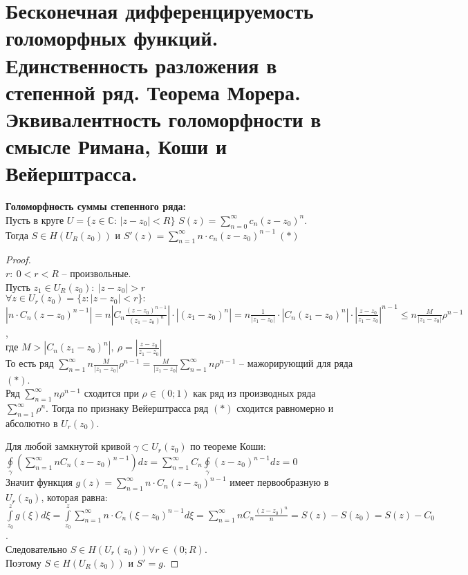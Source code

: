 \newpage
\section{Бесконечная дифференцируемость голоморфных функций. Единственность разложения в степенной ряд. Теорема Морера. Эквивалентность голоморфности в смысле Римана, Коши и Вейерштрасса.}


\textbf{Голоморфность суммы степенного ряда:}\\[2mm]
Пусть в круге $U=\{z\in \mathbb{C}: \, |z-z_0|<R\}$  $S(z) = \sum_{n=0}^\infty c_n (z-z_0)^n$.\\
Тогда $S \in H(U_R(z_0))$ и $S'(z)=\sum_{n=1}^\infty n\cdot c_n(z-z_0)^{n-1} \ (*)$

\begin{proof}
    \ \\
    $r: \ 0<r<R$ -- произвольные.\\
    Пусть $z_1 \in U_R(z_0): \ |z-z_0| > r$\\
    $\forall z \in U_r(z_0) = \{z: |z-z_0|<r\}:$\\
    $|n\cdot C_n(z-z_0)^{n-1}| = n\left|C_n\frac{(z-z_0)^{n-1}}{(z_1-z_0)^n}\right|\cdot |(z_1-z_0)^n|=n\frac{1}{|z_1-z_0|}\cdot |C_n (z_1-z_0)^n|\cdot \left|\frac{z-z_0}{z_1-z_0}\right|^{n-1}\leq n\frac{M}{|z_1-z_0|}\rho^{n-1}$,\\
    где $M > |C_n (z_1-z_0)^n|, \ \rho = \left|\frac{z-z_0}{z_1-z_0}\right|$\\
    То есть ряд $\sum_{n=1}^\infty n\frac{M}{|z_1-z_0|}\rho^{n-1}=\frac{M}{|z_1-z_0|}\sum_{n=1}^\infty n\rho^{n-1}$ -- мажорирующий для ряда $(*)$.\\
    Ряд $\sum_{n=1}^\infty n\rho^{n-1}$ сходится при $\rho \in (0; 1)$ как ряд из производных ряда $\sum_{n=1}^\infty\rho^n$. Тогда по признаку Вейерштрасса ряд $(*)$ сходится равномерно и абсолютно в $U_r(z_0)$.

    Для любой замкнутой кривой $\gamma \subset U_r(z_0)$ по теореме Коши:\\
    $\oint\limits_{\gamma}\left( \sum_{n=1}^\infty n C_n (z-z_0)^{n-1} \right)dz=\sum_{n=1}^\infty C_n \oint\limits_{\gamma}(z-z_0)^{n-1}dz=0$\\
    Значит функция $g(z)=\sum_{n=1}^\infty n\cdot C_n(z-z_0)^{n-1}$ имеет первообразную в $U_r(z_0)$, которая равна:\\
    $\int\limits_{z_0}^z g(\xi)d\xi = \int\limits_{z_0}^z\sum_{n=1}^{\infty} n\cdot C_n (\xi-z_0)^{n-1}d\xi=\sum_{n=1}^{\infty} n C_n \frac{(z-z_0)^n}{n} = S(z)-S(z_0) = S(z)-C_0$.\\
    Следовательно $S \in H(U_r(z_0)) \forall r \in (0; R)$.\\
    Поэтому $S \in H(U_R(z_0))$ и $S'=g$.
\end{proof}

